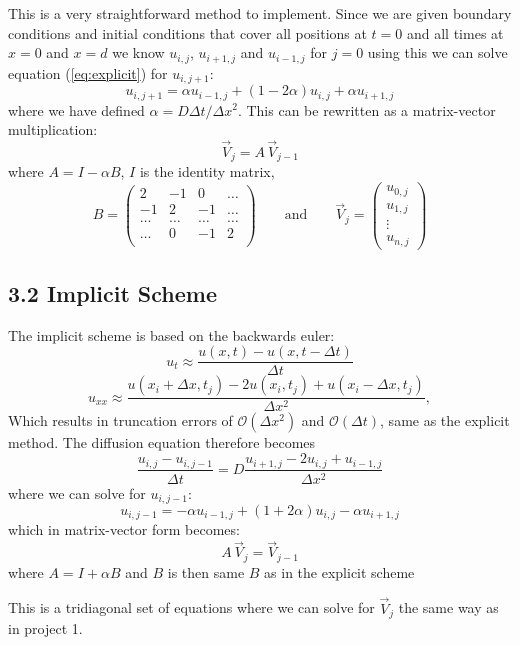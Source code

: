 \documentclass[a4paper,11pt]{report}
\begin{document}
This is a very straightforward method to implement. Since we are given boundary conditions and initial conditions that cover all positions at $t = 0$ and all times at $x = 0$ and $x = d$ we know $u_{i, j}$, $u_{i+1, j}$ and $u_{i-1, j}$ for $j=0$ using this we can solve equation (\ref{eq:explicit}) for  $u_{i, j+1}$: 
\[
u_{i, j+1} = \alpha u_{i-1, j} + (1-2\alpha)u_{i, j} + \alpha u_{i+1,j}
\]
where we have defined $\alpha = D \Delta t/\Delta x^2$. This can be rewritten as a matrix-vector multiplication: \[ \vec{V}_j = A \, \vec{V}_{j-1} \]
where \( A = I - \alpha B \), $I$ is the identity matrix, \[ B = \begin{pmatrix}
2 & -1 & 0 & \dots \\
-1 & 2 & -1 & \dots \\
\dots & \dots &  \dots & \dots \\
\dots & 0 & -1 & 2\\
\end{pmatrix} \qquad \mathrm{and} \qquad \vec{V}_j = \begin{pmatrix}
u_{0, j} \\ u_{1, j} \\ \vdots \\u_{n, j} \end{pmatrix}
\]

\subsection*{3.2 Implicit Scheme}

The implicit scheme is based on the backwards euler: 
\[
u_t\approx \frac{u(x,t)-u(x,t-\Delta t)}{\Delta t}
\]
\[
u_{xx}\approx \frac{u(x_i+\Delta x,t_j)-2u(x_i,t_j)+u(x_i-\Delta x,t_j)}{\Delta x^2},
\]
Which results in truncation errors of $\mathcal{O}(\Delta x^2)$ and $\mathcal{O}(\Delta t)$, same as the explicit method. 
The diffusion equation therefore becomes 
\begin{equation}\label{eq:Implicit}
\frac{u_{i, j} - u_{i, j-1} }{\Delta t} = D\frac{u_{i+1,j} - 2u_{i,j} + u_{i-1, j}}{\Delta x^2} 
\end{equation} 
where we can solve for $u_{i, j-1}$: 
\[
u_{i, j-1} = -\alpha u_{i-1, j} + (1+2\alpha)u_{i, j} - \alpha u_{i+1,j}
\]
which in matrix-vector form becomes: 
\[
A\, \vec{V}_j = \vec{V}_{j-1}
\] where \( A = I + \alpha B\) and $B$ is then same $B$ as in the explicit scheme

This is a tridiagonal set of equations where we can solve for $\vec{V}_j$ the same way as in project 1. 
\end{document}
